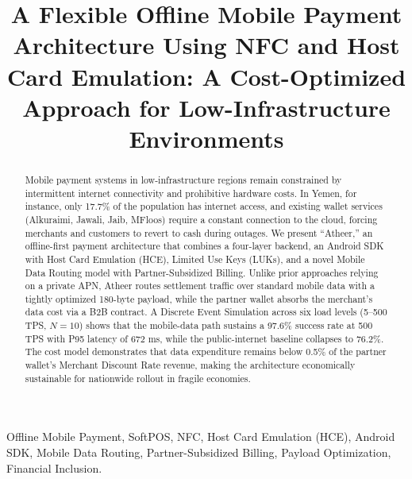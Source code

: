 \documentclass[conference,10pt]{IEEEtran}
\begin{document}
\title{A Flexible Offline Mobile Payment Architecture Using NFC and Host Card Emulation: A Cost-Optimized Approach for Low-Infrastructure Environments}

\author{
\and
{}
}

\maketitle

\begin{abstract}
Mobile payment systems in low-infrastructure regions remain constrained by intermittent internet connectivity and prohibitive hardware costs. In Yemen, for instance, only 17.7\% of the population has internet access, and existing wallet services (Alkuraimi, Jawali, Jaib, MFloos) require a constant connection to the cloud, forcing merchants and customers to revert to cash during outages. We present ``Atheer,'' an offline-first payment architecture that combines a four-layer backend, an Android SDK with Host Card Emulation (HCE), Limited Use Keys (LUKs), and a novel Mobile Data Routing model with Partner-Subsidized Billing. Unlike prior approaches relying on a private APN, Atheer routes settlement traffic over standard mobile data with a tightly optimized 180-byte payload, while the partner wallet absorbs the merchant's data cost via a B2B contract. A Discrete Event Simulation across six load levels (5--500 TPS, $N=10$) shows that the mobile-data path sustains a 97.6\% success rate at 500 TPS with P95 latency of 672 ms, while the public-internet baseline collapses to 76.2\%. The cost model demonstrates that data expenditure remains below 0.5\% of the partner wallet's Merchant Discount Rate revenue, making the architecture economically sustainable for nationwide rollout in fragile economies.
\end{abstract}

\begin{IEEEkeywords}
Offline Mobile Payment, SoftPOS, NFC, Host Card Emulation (HCE), Android SDK, Mobile Data Routing, Partner-Subsidized Billing, Payload Optimization, Financial Inclusion.
\end{IEEEkeywords}
\end{document}
